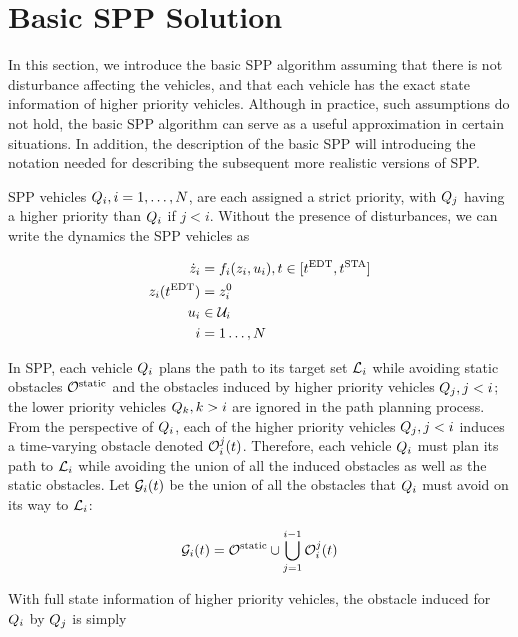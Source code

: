 \section{Basic SPP Solution\label{sec:basic}}
In this section, we introduce the basic SPP algorithm assuming that there is not disturbance affecting the vehicles, and that each vehicle has the exact state information of higher priority vehicles. Although in practice, such assumptions do not hold, the basic SPP algorithm can serve as a useful approximation in certain situations. In addition, the description of the basic SPP will introducing the notation needed for describing the subsequent more realistic versions of SPP. 

SPP vehicles $Q_{i}, i=1,\ldots,N$, are each assigned a strict priority, with $Q_{j}$ having a higher priority than $Q_{i}$ if $j<i$. Without the presence of disturbances, we can write the dynamics the SPP vehicles as

\begin{equation}
\begin{aligned}
\dot{z}_i &= f_i(z_i, u_i), t \in [t^\text{EDT}, t^\text{STA}] \\
z_i(t^\text{EDT}) &= z^0_i \\
u_i &\in \mathcal{U}_i \\
i &= 1 \ldots, N
\end{aligned}
\end{equation}

In SPP, each vehicle $Q_{i}$ plans the path to its target set $\mathcal{L}_i$ while avoiding static obstacles $\mathcal{O}^\text{static}$ and the obstacles induced by higher priority vehicles $Q_{j}, j<i$; the lower priority vehicles $Q_{k}, k>i$ are ignored in the path planning process. From the perspective of $Q_{i}$, each of the higher priority vehicles $Q_{j}, j<i$ induces a time-varying obstacle denoted $\mathcal{O}_i^j(t)$. Therefore, each vehicle $Q_{i}$ must plan its path to $\mathcal{L}_i$ while avoiding the union of all the induced obstacles as well as the static obstacles. Let $\mathcal{G}_i(t)$ be the union of all the obstacles that $Q_{i}$ must avoid on its way to $\mathcal{L}_i$:

\begin{equation}
\label{eq:obsseti}
\obsset_i(t)  = \soset \cup \bigcup_{j=1}^{i-1} \ioset_i^j(t)
\end{equation}

With full state information of higher priority vehicles, the obstacle induced for $Q_{i}$ by $Q_{j}$ is simply

